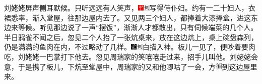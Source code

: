 刘姥姥屏声侧耳默候。只听远远有人笑声，{\includegraphics[width=3mm]{../Images/00002}\includegraphics[width=3mm]{../Images/00011}\footnotesize \kaishu 写得侍仆妇。}约有一二十妇人，衣裙悉率，渐入堂屋，往那边屋内去了。又见两三个妇人，都捧着大漆捧盒，进这东边来等候。听见那边说了一声“摆饭”，渐渐人才都散出，只有伺候端菜的几个人。半日鸦雀不闻之后，忽见二个人抬了一张炕桌来，放在这边炕上，桌上碗盘森列，仍是满满的鱼肉在内，不过略动了几样。{\includegraphics[width=3mm]{../Images/00006}\includegraphics[width=3mm]{../Images/00011}\footnotesize \kaishu 白描入神。}板儿一见了，便吵着要肉吃，刘姥姥一巴掌打下他去。忽见周瑞家的笑嘻嘻走过来，招手儿叫他。刘姥姥会意，于是携了板儿，下炕至堂屋中，周瑞家的又和他唧咕了一会，方\includegraphics[width=9.4pt,height=9.4pt,align=c,vshift=1pt]{../images/00015}到这边屋里来。

